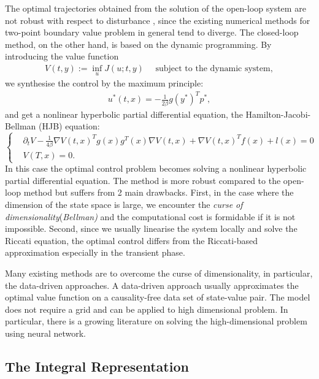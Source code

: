 \documentclass[12pt,fleqn]{amsart}
\theoremstyle{definition}
\begin{document}
The optimal trajectories obtained from the solution of the open-loop system are not robust with respect to disturbance \cite{azmi2021optimal}, since the existing numerical methods for two-point boundary value problem in general tend to diverge. The closed-loop method, on the other hand, is based on the dynamic programming. By introducing the value function 
\begin{align*}
	 V(t, y):= \inf_u J(u; t, y) \quad \text{ subject to the dynamic system},
\end{align*}
we synthesise the control by the maximum principle:
\begin{align*}
	u^*(t, x) = -\frac{1}{2\beta} g(y^*)^T p^* ,
\end{align*} 
and get a nonlinear hyperbolic partial differential equation, the Hamilton-Jacobi-Bellman (HJB) equation:
\begin{equation}
\label{HJB}
\tag{HJB}
\left\{
\begin{aligned}
	& \partial_t V - \frac{1}{4\beta} \nabla V(t, x)^T  g(x) g^T(x) \nabla V (t, x) + \nabla V(t, x)^T f(x) + l(x)  = 0 \\
	& V(T, x) = 0. 
\end{aligned}
\right.
\end{equation}
In this case the optimal control problem becomes solving a nonlinear hyperbolic partial differential equation. 
The method is more robust compared to the open-loop method but suffers from 2 main drawbacks. 
First, in the case where the dimension of the state space is large, we encounter the \textit{curse of dimensionality}(\textit{Bellman)} and the computational cost is formidable if it is not impossible. 
Second, since we usually linearise the system locally and solve the Riccati equation, the optimal control differs from the Riccati-based approximation especially in the transient phase. \par  

Many existing methods are to overcome the curse of dimensionality, in particular, the data-driven approaches. 
A data-driven approach usually approximates the optimal value function on a causality-free data set of state-value pair. 
The model does not require a grid and can be applied to high dimensional problem. 
In particular, there is a growing literature on solving the high-dimensional problem using  neural network. 


\subsection{The Integral Representation}
\end{document}
